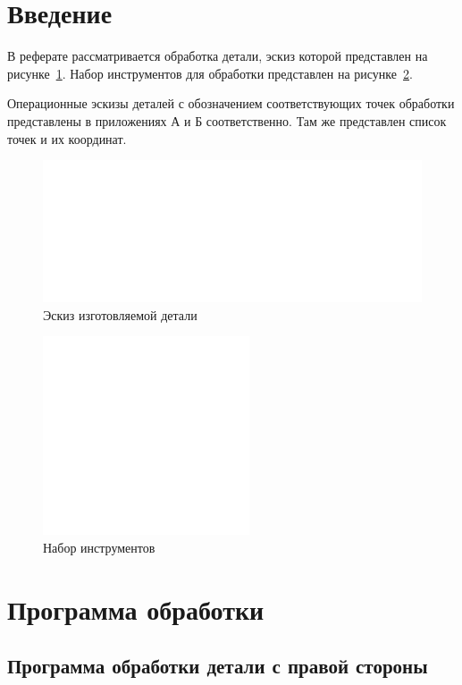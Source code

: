 \section*{Введение}

В реферате рассматривается обработка детали, эскиз которой представлен на рисунке~\ref{fig:sketch}. Набор инструментов для обработки представлен на рисунке~\ref{fig:tools}.

Операционные эскизы деталей с обозначением соответствующих точек обработки представлены в приложениях А и Б соответственно. Там же представлен список точек и их координат.

\begin{figure}[ht]
    \includegraphics[width=.8\linewidth]{Figures/sketch.png}
    \caption{Эскиз изготовляемой детали}
    \label{fig:sketch}
\end{figure}

\begin{figure}[ht]
    \includegraphics[width=.5\linewidth]{Figures/tools.png}
    \caption{Набор инструментов}
    \label{fig:tools}
\end{figure}

\section{Программа обработки}

\subsection{Программа обработки детали с правой стороны}

